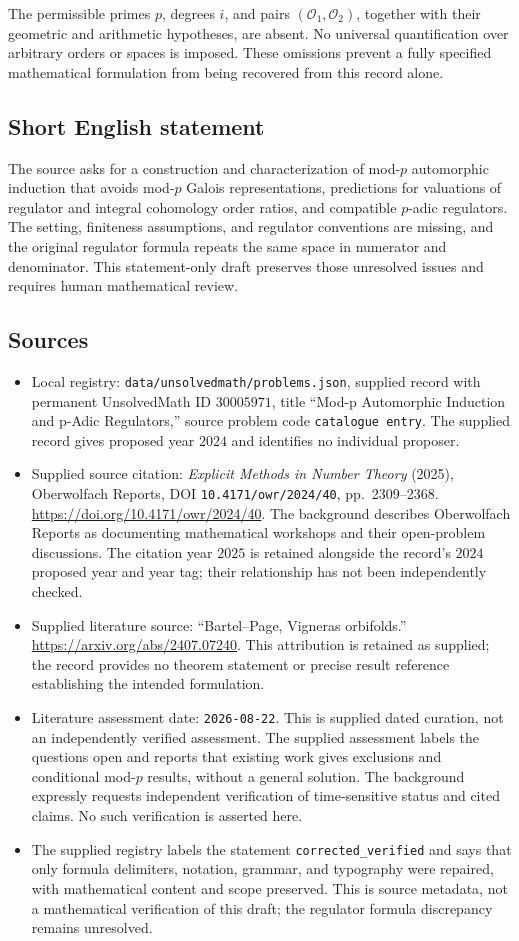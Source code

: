 \documentclass[11pt]{article}
\begin{document}
The permissible primes \(p\), degrees \(i\), and pairs \((\mathcal O_1,\mathcal O_2)\), together with their geometric and arithmetic hypotheses, are absent. No universal quantification over arbitrary orders or spaces is imposed. These omissions prevent a fully specified mathematical formulation from being recovered from this record alone.
\subsection{Short English statement}
The source asks for a construction and characterization of mod-\(p\) automorphic induction that avoids mod-\(p\) Galois representations, predictions for valuations of regulator and integral cohomology order ratios, and compatible \(p\)-adic regulators. The setting, finiteness assumptions, and regulator conventions are missing, and the original regulator formula repeats the same space in numerator and denominator. This statement-only draft preserves those unresolved issues and requires human mathematical review.
\subsection{Sources}
\begin{itemize}
\item Local registry: \texttt{data/unsolvedmath/problems.json}, supplied record with permanent UnsolvedMath ID \(30005971\), title ``Mod-p Automorphic Induction and p-Adic Regulators,'' source problem code \texttt{catalogue entry}. The supplied record gives proposed year \(2024\) and identifies no individual proposer.
\item Supplied source citation: \emph{Explicit Methods in Number Theory} (2025), Oberwolfach Reports, DOI \texttt{10.4171/owr/2024/40}, pp.\ 2309--2368. \url{https://doi.org/10.4171/owr/2024/40}. The background describes Oberwolfach Reports as documenting mathematical workshops and their open-problem discussions. The citation year \(2025\) is retained alongside the record's \(2024\) proposed year and year tag; their relationship has not been independently checked.
\item Supplied literature source: ``Bartel--Page, Vigneras orbifolds.'' \url{https://arxiv.org/abs/2407.07240}. This attribution is retained as supplied; the record provides no theorem statement or precise result reference establishing the intended formulation.
\item Literature assessment date: \texttt{2026-08-22}. This is supplied dated curation, not an independently verified assessment. The supplied assessment labels the questions open and reports that existing work gives exclusions and conditional mod-\(p\) results, without a general solution. The background expressly requests independent verification of time-sensitive status and cited claims. No such verification is asserted here.
\item The supplied registry labels the statement \texttt{corrected\_verified} and says that only formula delimiters, notation, grammar, and typography were repaired, with mathematical content and scope preserved. This is source metadata, not a mathematical verification of this draft; the regulator formula discrepancy remains unresolved.
\end{itemize}
\end{document}
